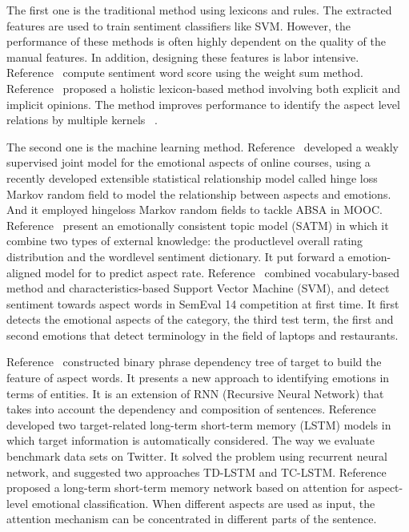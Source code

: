 \documentclass[runningheads, twocolumn]{llncs}
\begin{document}
The first one is the traditional method using lexicons and rules. The extracted features are used to train sentiment classifiers like SVM. However, the performance of these methods is often highly dependent on the quality of the manual features. In addition, designing these features is labor intensive. Reference~\cite{DBLP:conf/kdd/HuL04} compute sentiment word score using the weight sum method. Reference~\cite{DBLP:conf/wsdm/DingLY08} proposed a holistic lexicon-based method involving both explicit and implicit opinions. The method improves performance to identify the aspect level relations by multiple kernels ~\cite{DBLP:conf/cicling/NguyenS15}.

The second one is the machine learning method. Reference~\cite{DBLP:conf/acl/RameshKFG15} developed a weakly supervised joint model for the emotional aspects of online courses, using a recently developed extensible statistical relationship model called hinge loss Markov random field to model the relationship between aspects and emotions. And it employed hingeloss Markov random fields to tackle ABSA in MOOC. Reference~\cite{DBLP:conf/emnlp/WangE14} present an emotionally consistent topic model (SATM) in which it combine two types of external knowledge: the productlevel overall rating distribution and the wordlevel sentiment dictionary. It put forward a emotion-aligned model for to predict aspect rate. Reference~\cite{DBLP:conf/semeval/KiritchenkoZCM14} combined vocabulary-based method and characteristics-based Support Vector Machine (SVM), and  detect sentiment towards aspect words in SemEval 14 competition at first time. It first detects the emotional aspects of the category, the third test term, the first and second emotions that detect terminology in the field of laptops and restaurants. 

Reference~\cite{DBLP:conf/emnlp/NguyenS15} constructed binary phrase dependency tree of target to build the feature of aspect words. It presents a new approach to identifying emotions in terms of entities. It is an extension of RNN (Recursive Neural Network) that takes into account the dependency and composition of sentences. Reference~\cite{DBLP:conf/coling/TangQFL16} developed two target-related long-term short-term memory (LSTM) models in which target information is automatically considered. The way we evaluate benchmark data sets on Twitter. It solved the problem using recurrent neural network, and suggested two approaches TD-LSTM and TC-LSTM. Reference~\cite{DBLP:conf/emnlp/WangHZZ16} proposed a long-term short-term memory network based on attention for aspect-level emotional classification. When different aspects are used as input, the attention mechanism can be concentrated in different parts of the sentence.
\end{document}
